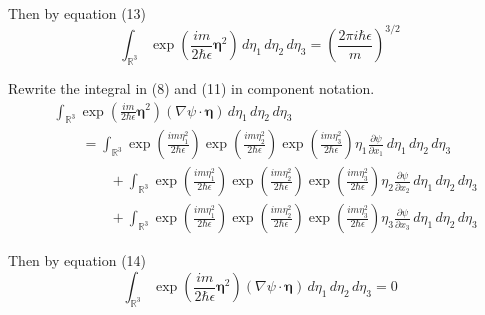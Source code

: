 \documentclass[12pt]{article}
\begin{document}
Then by equation (13)
\begin{equation*}
\int_{\mathbb R^3}
\exp\left(\frac{im}{2\hbar\epsilon}\boldsymbol\eta^2\right)
\,d\eta_1\,d\eta_2\,d\eta_3
=\left(\frac{2\pi i\hbar\epsilon}{m}\right)^{3/2}
\tag{16}
\end{equation*}

Rewrite the integral in (8) and (11) in component notation.
\begin{align*}
&\int_{\mathbb R^3}
\exp\left(\frac{im}{2\hbar\epsilon}\boldsymbol\eta^2\right)
(\nabla\psi\cdot\boldsymbol\eta)
\,d\eta_1\,d\eta_2\,d\eta_3
\\
&\qquad{}=
\int_{\mathbb R^3}
\exp\left(\frac{im\eta_1^2}{2\hbar\epsilon}\right)
\exp\left(\frac{im\eta_2^2}{2\hbar\epsilon}\right)
\exp\left(\frac{im\eta_3^2}{2\hbar\epsilon}\right)
\eta_1\frac{\partial\psi}{\partial x_1}
\,d\eta_1\,d\eta_2\,d\eta_3
\\
&\qquad\qquad{}+\int_{\mathbb R^3}
\exp\left(\frac{im\eta_1^2}{2\hbar\epsilon}\right)
\exp\left(\frac{im\eta_2^2}{2\hbar\epsilon}\right)
\exp\left(\frac{im\eta_3^2}{2\hbar\epsilon}\right)
\eta_2\frac{\partial\psi}{\partial x_2}
\,d\eta_1\,d\eta_2\,d\eta_3
\\
&\qquad\qquad{}+\int_{\mathbb R^3}
\exp\left(\frac{im\eta_1^2}{2\hbar\epsilon}\right)
\exp\left(\frac{im\eta_2^2}{2\hbar\epsilon}\right)
\exp\left(\frac{im\eta_3^2}{2\hbar\epsilon}\right)
\eta_3\frac{\partial\psi}{\partial x_3}
\,d\eta_1\,d\eta_2\,d\eta_3
\end{align*}

Then by equation (14)
\begin{equation*}
\int_{\mathbb R^3}
\exp\left(\frac{im}{2\hbar\epsilon}\boldsymbol\eta^2\right)
(\nabla\psi\cdot\boldsymbol\eta)
\,d\eta_1\,d\eta_2\,d\eta_3=0
\tag{17}
\end{equation*}
\end{document}
